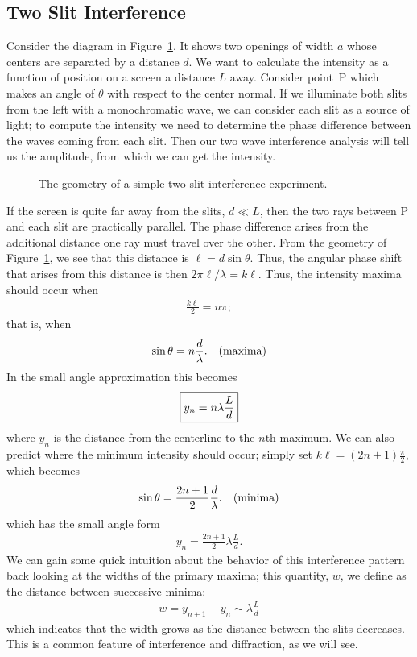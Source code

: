 \subsection{Two Slit Interference}

Consider the diagram in Figure~\ref{fig:diff:2-slit}. It shows two openings of 
width $a$ whose centers are separated by a distance $d$. We want to calculate 
the intensity as a function of position on a screen a distance $L$ away. 
Consider point~P which makes an angle of $\theta$ with respect to the center 
normal. If we illuminate both slits from the left with a monochromatic wave, 
we can consider each slit as a source of light; to compute the intensity we 
need to determine the phase difference between the waves coming from each slit.
Then our two wave interference analysis will tell us the amplitude, from which 
we can get the intensity.
\begin{figure}[htb]
\centerline{\epsfxsize=10cm }
\caption{The geometry of a simple two slit interference experiment.}
\label{fig:diff:2-slit}
\end{figure}

If the screen is quite far away from the slits, $d \ll L$, then the two rays
between P and each slit are practically parallel. The phase difference arises
from the additional distance one ray must travel over the other. From the 
geometry of Figure~\ref{fig:diff:2-slit}, we see that this distance is
$ \ell = d \sin \theta.$ Thus, the angular phase shift that arises from this 
distance is then $2 \pi \ell/\lambda = k \ell$. Thus, the intensity
maxima should occur when
\begin{eqnarray*}
\frac{k \ell}{2} = n \pi;
\end{eqnarray*}
that is, when
\begin{eqnarray}
\sin \theta = n \frac{d}{\lambda}.~~~{\rm (maxima)}
\label{eq:diff:2 slit maxima}
\end{eqnarray}
In the small angle approximation this becomes
\begin{eqnarray*}
\fbox{$ \displaystyle y_n=n \lambda \frac{L}{d} $}
\end{eqnarray*}
where $y_n$ is the distance from the centerline to the $n$th maximum.
We can also predict where the minimum intensity should occur; simply set
$k \ell = (2n+1) \frac{\pi}{2}$, which becomes
\begin{eqnarray}
\sin \theta = \frac{2n+1}{2} \frac{d}{\lambda}. ~~~{\rm (minima)}
\label{eq:diff:2 slit minima}
\end{eqnarray}
which has the small angle form
\begin{eqnarray*}
y_n = \frac{2n+1}{2} \lambda \frac{L}{d}.
\end{eqnarray*}
We can gain some quick intuition about the behavior of this interference 
pattern back looking at the widths of the primary maxima; this quantity, $w$, 
we define as the distance between successive minima:
\begin{eqnarray*}
w = y_{n+1}-y_n \sim \lambda \frac{L}{d}
\end{eqnarray*}
which indicates that the width grows as the distance between the slits 
decreases. This is a common feature of interference and diffraction, as we will
see.


